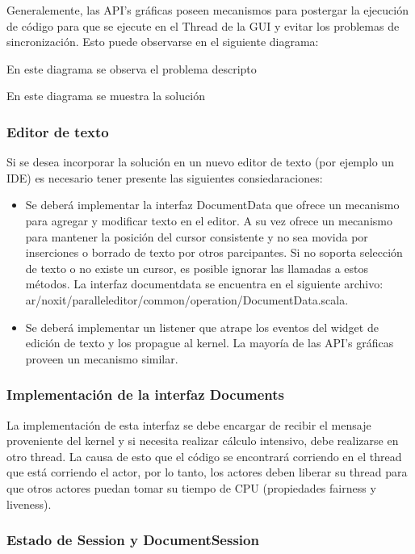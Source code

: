 \documentclass[12pt,a4paper]{article}
\begin{document}
Generalemente, las API’s gráficas poseen mecanismos para postergar la ejecución de código para que se ejecute en el Thread de
la GUI y evitar los problemas de sincronización. Esto puede observarse en el siguiente diagrama:

En este diagrama se observa el problema descripto

En este diagrama se muestra la solución

\subsubsection{Editor de texto}
Si se desea incorporar la solución en un nuevo editor de texto (por ejemplo un IDE) es necesario tener presente 
las siguientes consiedaraciones:

	\begin{itemize}
		\item Se deberá implementar la interfaz DocumentData que ofrece un mecanismo para agregar y modificar texto en el editor. 
		A su vez ofrece un mecanismo para mantener la posición del cursor consistente y no sea movida por inserciones o
		borrado de texto por otros parcipantes. Si no soporta selección de texto o no existe un cursor, es posible ignorar
		las llamadas a estos métodos.
		La interfaz documentdata se encuentra en el siguiente archivo: ar/noxit/paralleleditor/common/operation/DocumentData.scala.
		\item  Se deberá implementar un listener que atrape los eventos del widget de edición de texto y los propague al kernel.
		La mayoría de las API’s gráficas proveen un mecanismo similar.
	\end{itemize}


\subsubsection{Implementación de la interfaz Documents}
La implementación de esta interfaz se debe encargar de recibir el mensaje proveniente del kernel y si necesita realizar
cálculo intensivo, debe realizarse en otro thread. La causa de esto que el código se encontrará corriendo en el thread que
está corriendo el actor, por lo tanto, los actores deben liberar su thread para que otros actores puedan tomar su tiempo de CPU
(propiedades fairness y liveness).

\subsubsection{Estado de Session y DocumentSession}
\end{document}
